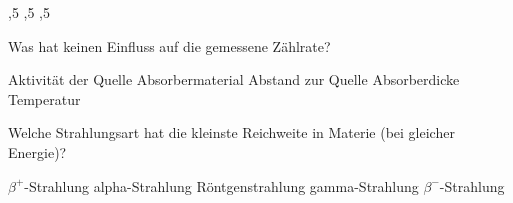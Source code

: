 \documentclass[11pt]{exam}
\begin{document}
\begin{questions}
\begin{choices}
	,5 %
	,5 %
	,5 %
\end{choices}

\vspace{3mm}\question Was hat keinen Einfluss auf die gemessene Zählrate?

\begin{choices}
	\choice Aktivität der Quelle
	\choice Absorbermaterial
	\choice Abstand zur Quelle
	\choice Absorberdicke
	\choice Temperatur
\end{choices}

\vspace{3mm}\question Welche Strahlungsart hat die kleinste Reichweite in Materie (bei gleicher Energie)?

\begin{choices}
	\choice \( \beta^+ \)-Strahlung
	\choice alpha-Strahlung
	\choice Röntgenstrahlung
	\choice gamma-Strahlung
	\choice \( \beta^- \)-Strahlung
\end{choices}

\vspace{3mm}\end{questions}
\end{document}
